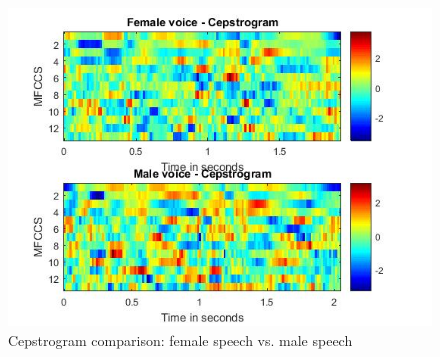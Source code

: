 \pagebreak
\begin{figure}[h]
		\centering
		\includegraphics[width=0.75\linewidth, keepaspectratio]{./images/10.jpg}
		\caption{Cepstrogram comparison: female speech vs. male speech}
		\label{fig:10}	
\end{figure}
